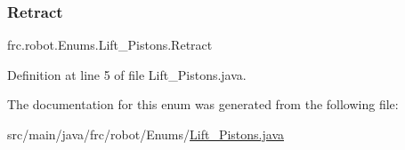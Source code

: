 \subsubsection{\texorpdfstring{Retract}{Retract}}
{\footnotesize\ttfamily frc.\+robot.\+Enums.\+Lift\+\_\+\+Pistons.\+Retract}



Definition at line 5 of file Lift\+\_\+\+Pistons.\+java.



The documentation for this enum was generated from the following file\+:\begin{DoxyCompactItemize}
\item 
src/main/java/frc/robot/\+Enums/\hyperlink{Lift__Pistons_8java}{Lift\+\_\+\+Pistons.\+java}\end{DoxyCompactItemize}
